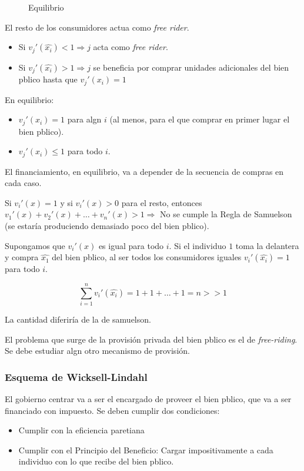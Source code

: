\begin{figure}
	\centering
	\caption{Equilibrio}
\end{figure}

El resto de los consumidores actua como \emph{free rider}.
\begin{itemize}
	\item Si $v_j ' (\widehat{x_i})<1 \Rightarrow j$ acta como \emph{free rider}.
	\item Si $v_j ' (\widehat{x_i})>1 \Rightarrow j$ se beneficia por comprar unidades adicionales del bien pblico hasta que $v_j ' (x_i)=1$
\end{itemize}

En equilibrio:

\begin{itemize}
	\item $v_j ' (x_i)=1$ para algn $i$ (al menos, para el que comprar en primer lugar el bien pblico).
	\item $v_j ' (x_i) \leq 1$ para todo $i$.
\end{itemize}

El financiamiento, en equilibrio, va a depender de la secuencia de compras en cada caso. 

Si $v_i ' (x)=1$ y si $v_i ' (x)>0$ para el resto, entonces $v_1 ' (x)+v_2 ' (x)+ \ldots + v_n ' (x)>1 \Rightarrow$ No se cumple la Regla de Samuelson (se estaría produciendo demasiado poco del bien pblico).

Supongamos que $v_i ' (x)$ es igual para todo $i$. Si el individuo $1$ toma la delantera y compra $\widehat{x_1}$ del bien pblico, al ser todos los consumidores iguales $v_i ' (\widehat{x_i})=1$ para todo $i$.

$$\sum_{i=1}^{n}v_i ' (\widehat{x_i})=1+1+\ldots +1=n >>1$$

La cantidad diferiría de la de samuelson.

El problema que surge de la provisión privada del bien pblico es el de \emph{free-riding}. Se debe estudiar algn otro mecanismo de provisión.

\subsubsection{Esquema de Wicksell-Lindahl}

El gobierno centrar va a ser el encargado de proveer el bien pblico, que va a ser financiado con impuesto. Se deben cumplir dos condiciones:
\begin{itemize}
	\item Cumplir con la eficiencia paretiana
	\item Cumplir con el Principio del Beneficio: Cargar impositivamente a cada individuo con lo que recibe del bien pblico.
\end{itemize}

